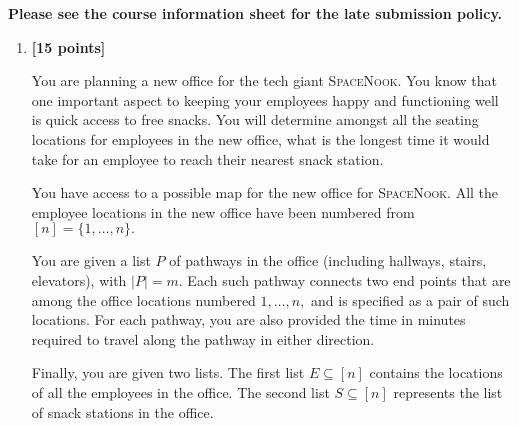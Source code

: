 \documentclass{assignment-373}
\begin{document}
\think

\textbf{Please see the course information sheet for the late submission
  policy.}

\begin{enumerate}
\item \textbf{[15 points]}

  You are planning a new office for the tech giant
  \textsc{SpaceNook}. You know that one important aspect to keeping
  your employees happy and functioning well is quick access to free
  snacks.  You will determine amongst all the seating locations for
  employees in the new office, what is the longest time it would take
  for an employee to reach their nearest snack station.


  You have access to a possible map for the new office for
  \textsc{SpaceNook}.  All the employee locations in the new office
  have been numbered from $[n] = \{1,\ldots, n\}.$
  
  You are given a list $P$ of pathways in the office (including
  hallways, stairs, elevators), with $|P| = m$. Each such pathway
  connects two end points that are among the office locations numbered
  $1, \ldots, n,$ and is specified as a pair of such locations.
%
  For each pathway, you are also provided the time in minutes required
  to travel along the pathway in either direction.


  Finally, you are given two lists. The first list $E \subseteq [n]$
  contains the locations of all the employees in the office.
%
  The second list $S \subseteq [n]$ represents the list of snack
  stations in the office.


\end{enumerate}
\end{document}
